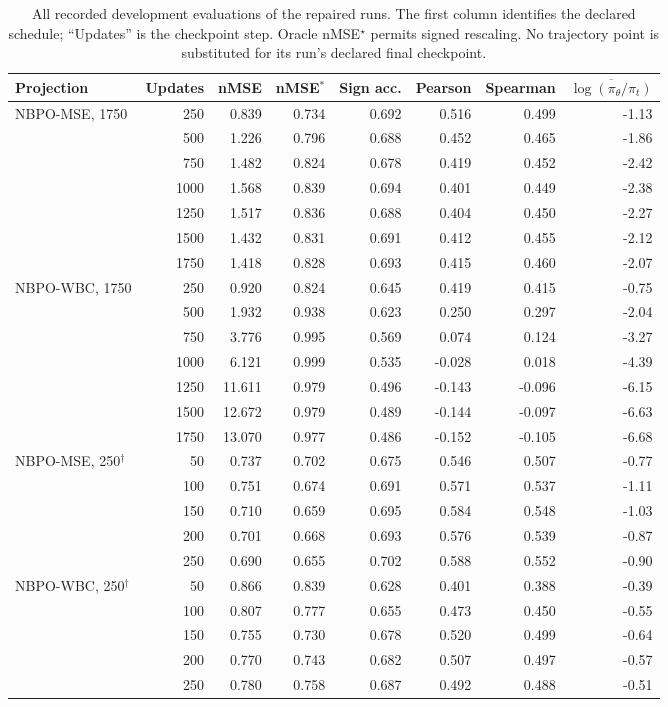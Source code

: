 \documentclass{article}
\theoremstyle{remark}
\theoremstyle{plain}
\begin{document}
\begin{table}[t]
\centering\scriptsize
\caption{All recorded development evaluations of the repaired runs. The first column identifies the declared schedule; ``Updates'' is the checkpoint step. Oracle nMSE$^\star$ permits signed rescaling. No trajectory point is substituted for its run's declared final checkpoint.}
\label{tab:realization-trajectories}
\begin{tabular}{lrrrrrrr}
\toprule
Projection & Updates & nMSE & nMSE$^\ast$ & Sign acc. & Pearson & Spearman & $\overline{\log(\pi_\theta/\pi_t)}$\\
\midrule
NBPO-MSE, 1750 & 250 & 0.839 & 0.734 & 0.692 & 0.516 & 0.499 & -1.13\\
 & 500 & 1.226 & 0.796 & 0.688 & 0.452 & 0.465 & -1.86\\
 & 750 & 1.482 & 0.824 & 0.678 & 0.419 & 0.452 & -2.42\\
 & 1000 & 1.568 & 0.839 & 0.694 & 0.401 & 0.449 & -2.38\\
 & 1250 & 1.517 & 0.836 & 0.688 & 0.404 & 0.450 & -2.27\\
 & 1500 & 1.432 & 0.831 & 0.691 & 0.412 & 0.455 & -2.12\\
 & 1750 & 1.418 & 0.828 & 0.693 & 0.415 & 0.460 & -2.07\\

\midrule
NBPO-WBC, 1750 & 250 & 0.920 & 0.824 & 0.645 & 0.419 & 0.415 & -0.75\\
 & 500 & 1.932 & 0.938 & 0.623 & 0.250 & 0.297 & -2.04\\
 & 750 & 3.776 & 0.995 & 0.569 & 0.074 & 0.124 & -3.27\\
 & 1000 & 6.121 & 0.999 & 0.535 & -0.028 & 0.018 & -4.39\\
 & 1250 & 11.611 & 0.979 & 0.496 & -0.143 & -0.096 & -6.15\\
 & 1500 & 12.672 & 0.979 & 0.489 & -0.144 & -0.097 & -6.63\\
 & 1750 & 13.070 & 0.977 & 0.486 & -0.152 & -0.105 & -6.68\\

\midrule
NBPO-MSE, 250$^\dagger$ & 50 & 0.737 & 0.702 & 0.675 & 0.546 & 0.507 & -0.77\\
 & 100 & 0.751 & 0.674 & 0.691 & 0.571 & 0.537 & -1.11\\
 & 150 & 0.710 & 0.659 & 0.695 & 0.584 & 0.548 & -1.03\\
 & 200 & 0.701 & 0.668 & 0.693 & 0.576 & 0.539 & -0.87\\
 & 250 & 0.690 & 0.655 & 0.702 & 0.588 & 0.552 & -0.90\\

\midrule
NBPO-WBC, 250$^\dagger$ & 50 & 0.866 & 0.839 & 0.628 & 0.401 & 0.388 & -0.39\\
 & 100 & 0.807 & 0.777 & 0.655 & 0.473 & 0.450 & -0.55\\
 & 150 & 0.755 & 0.730 & 0.678 & 0.520 & 0.499 & -0.64\\
 & 200 & 0.770 & 0.743 & 0.682 & 0.507 & 0.497 & -0.57\\
 & 250 & 0.780 & 0.758 & 0.687 & 0.492 & 0.488 & -0.51\\
\bottomrule
\end{tabular}
\end{table}
\end{document}
